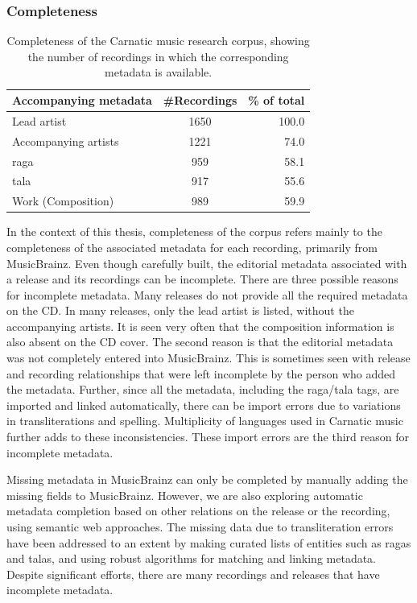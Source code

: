 \subsubsection{Completeness}
\begin{table}
\begin{centering}
\begin{tabular}{@{}lcr@{}}
\toprule 
\textbf{Accompanying metadata} & \textbf{\#Recordings} & \textbf{\% of total}\tabularnewline
\midrule 
Lead artist & 1650 & 100.0 \tabularnewline
Accompanying artists& 1221 & 74.0\tabularnewline
\Gls{raga} & 959 & 58.1\tabularnewline
\Gls{tala} & 917 & 55.6\tabularnewline
Work (Composition) & 989 & 59.9\tabularnewline
\bottomrule 
\end{tabular}
\par\end{centering}
\caption[Completeness of the Carnatic music research corpus]{Completeness of the Carnatic music research corpus, showing the number of recordings in which the corresponding metadata is available.}\label{tab:completeness:Carnatic}
\end{table}
In the context of this thesis, completeness of the corpus refers mainly to the completeness of the associated metadata for each recording, primarily from MusicBrainz. Even though carefully built, the editorial metadata associated with a release and its recordings can be incomplete. There are three possible reasons for incomplete metadata. Many releases do not provide all the required metadata on the CD. In many releases, only the lead artist is listed, without the accompanying artists. It is seen very often that the composition information is also absent on the CD cover. The second reason is that the editorial metadata was not completely entered into MusicBrainz. This is sometimes seen with release and recording relationships that were left incomplete by the person who added the metadata. Further, since all the metadata, including the \gls{raga}/\gls{tala} tags, are imported and linked automatically, there can be import errors due to variations in transliterations and spelling. Multiplicity of languages used in Carnatic music further adds to these inconsistencies. These import errors are the third reason for incomplete metadata. 

Missing metadata in MusicBrainz can only be completed by manually adding the missing fields to MusicBrainz. However, we are also exploring automatic metadata completion based on other relations on the release or the recording, using semantic web approaches. The missing data due to transliteration errors have been addressed to an extent by making curated lists of entities such as \glspl{raga} and \glspl{tala}, and using robust algorithms for matching and linking metadata. Despite significant efforts, there are many recordings and releases that have incomplete metadata. 

